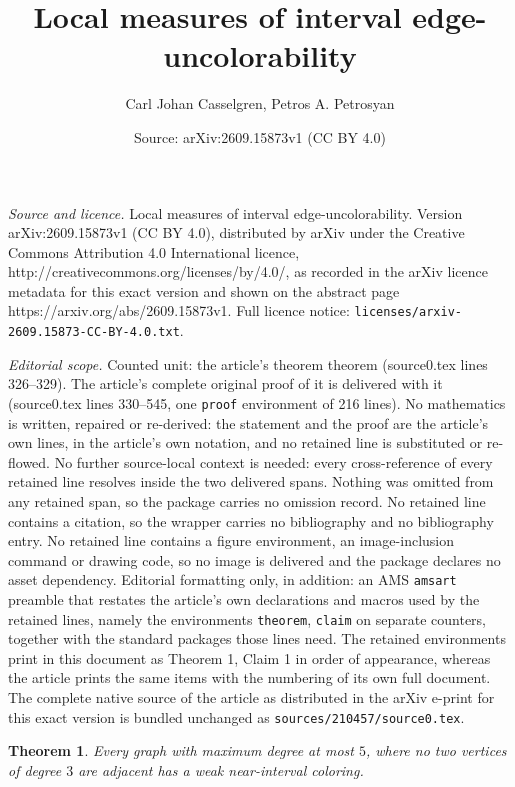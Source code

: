 \documentclass[10pt,a4paper]{amsart}
\title{Local measures of interval edge-uncolorability}
\author{Carl Johan Casselgren, Petros A. Petrosyan}
\date{Source: arXiv:2609.15873v1 (CC BY 4.0)}
\newtheorem{theorem}{Theorem}
\begin{document}
\maketitle

\noindent\emph{Source and licence.} Local measures of interval edge-uncolorability. Version arXiv:2609.15873v1 (CC BY 4.0), distributed by arXiv under the Creative Commons Attribution 4.0 International licence, http://creativecommons.org/licenses/by/4.0/, as recorded in the arXiv licence metadata for this exact version and shown on the abstract page https://arxiv.org/abs/2609.15873v1. Full licence notice: \texttt{licenses/arxiv-2609.15873-CC-BY-4.0.txt}.\par\smallskip

\noindent\textit{Editorial scope.} Counted unit: the article's theorem theorem (source0.tex lines 326--329). The article's complete original proof of it is delivered with it (source0.tex lines 330--545, one \texttt{proof} environment of 216 lines). No mathematics is written, repaired or re-derived: the statement and the proof are the article's own lines, in the article's own notation, and no retained line is substituted or re-flowed.  No further source-local context is needed: every cross-reference of every retained line resolves inside the two delivered spans.  Nothing was omitted from any retained span, so the package carries no omission record.  No retained line contains a citation, so the wrapper carries no bibliography and no bibliography entry.  No retained line contains a figure environment, an image-inclusion command or drawing code, so no image is delivered and the package declares no asset dependency.  Editorial formatting only, in addition: an AMS \texttt{amsart} preamble that restates the article's own declarations and macros used by the retained lines, namely the environments \texttt{theorem}, \texttt{claim} on separate counters, together with the standard packages those lines need.  The retained environments print in this document as Theorem 1, Claim 1 in order of appearance, whereas the article prints the same items with the numbering of its own full document.  The complete native source of the article as distributed in the arXiv e-print for this exact version is bundled unchanged as \texttt{sources/210457/source0.tex}.
\begin{theorem}
	Every graph with maximum degree at most $5$, where no two vertices of degree $3$ are
	adjacent has a weak near-interval coloring.
\end{theorem}
\end{document}
